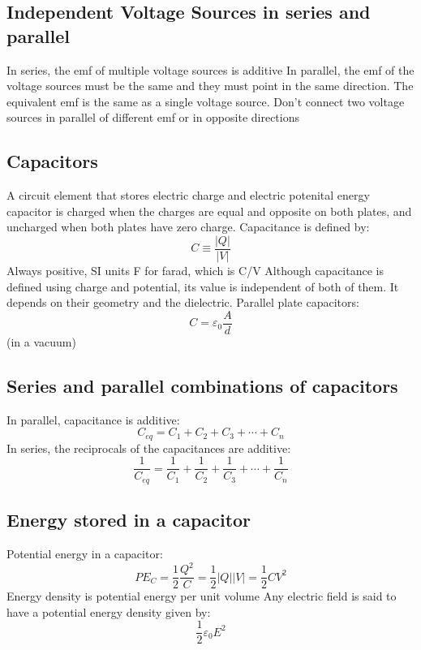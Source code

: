 \documentclass[twocolumn]{article}
\begin{document}
\subsection{Independent Voltage Sources in series and parallel}
\begin{outline}
	\1 In series, the emf of multiple voltage sources is additive
	\1 In parallel, the emf of the voltage sources must be the same and they must point in the same direction. The equivalent emf is the same as a single voltage source. 
	\1 Don't connect two voltage sources in parallel of different emf or in opposite directions

\end{outline}
\subsection{Capacitors}
\begin{outline}
	\1 A circuit element that stores electric charge and electric potenital energy 
	\1 capacitor is charged when the charges are equal and opposite on both plates, and uncharged when both plates have zero charge. 
	\1 Capacitance is defined by: \[C\equiv \dfrac{|Q|}{|V|}\] Always positive, SI units F for farad, which is C/V 
	\1 Although capacitance is defined using charge and potential, its value is independent of both of them. It depends on their geometry and the dielectric.
	\1 Parallel plate capacitors: \[C=\varepsilon_0\dfrac{A}{d}\] (in a vacuum)
\end{outline}
\subsection{Series and parallel combinations of capacitors}
\begin{outline}
	\1 In parallel, capacitance is additive: \[C_{eq}=C_1+C_2+C_3+\cdots+C_n\]
	\1 In series, the reciprocals of the capacitances are additive: \[\dfrac{1}{C_{eq}}=\dfrac{1}{C_1}+\dfrac{1}{C_2}+\dfrac{1}{C_3}+\cdots+\dfrac{1}{C_n}\]
\end{outline}
\subsection{Energy stored in a capacitor}
\begin{outline}
	\1 Potential energy in a capacitor: \[PE_C=\dfrac{1}{2}\dfrac{Q^2}{C}=\dfrac{1}{2}|Q||V|=\dfrac{1}{2}CV^2\]
	\1 Energy density is potential energy per unit volume
	\1 Any electric field is said to have a potential energy density given by: \[\dfrac{1}{2}\varepsilon_0E^2\]
\end{outline}
\end{document}
